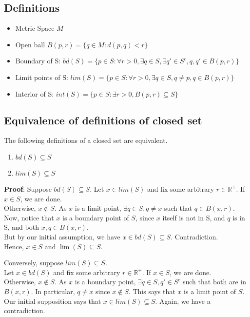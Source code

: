 \documentclass{article}
\begin{document}
\subsection{Definitions}
\begin{itemize}
	\item Metric Space $M$
	\item Open ball $B(p,r)=\{q\in M : d(p,q) < r \}$
	\item Boundary of S: $bd(S)=\{p\in S : \forall r > 0, \exists q\in S, \exists q'\in S^c, q,q'\in B(p,r) \}$
	\item Limit points of S: $lim(S)=\{p\in S : \forall r > 0, \exists q\in S, q\neq p, q\in B(p,r) \}$
	\item Interior of S: $int(S)=\{p\in S : \exists r > 0, B(p,r)\subseteq S\}$
\end{itemize}
\subsection{Equivalence of definitions of closed set}
The following definitions of a closed set are equivalent.

\begin{enumerate}
	\item $bd(S)\subseteq S$
	\item $lim(S)\subseteq S$
\end{enumerate}

\textbf{Proof}: Suppose $bd(S)\subseteq S$. 
Let $x\in lim(S)$ and fix some arbitrary $r\in \mathbb{R}^+$.
If $x\in S$, we are done.\\
Otherwise,  $x\not \in S$. As $x$ is a limit point, $\exists q\in S, q\neq x$ such that $q\in B(x,r)$. Now, notice that $x$ is a boundary point of $S$, since $x$ itself is not in S, and $q$ is in S, and both $x,q\in B(x,r)$.\\
But by our initial assumption, we have $x\in bd(S)\subseteq S$. Contradiction.\\
Hence, $x\in S$ and $\lim(S)\subseteq S$.

Conversely, suppose $lim(S)\subseteq S$.\\
Let $x\in bd(S)$ and fix some arbitrary $r\in \mathbb{R}^+$. If $x\in S$, we are done.\\
Otherwise, $x\not \in S$. As $x$ is a boundary point, $\exists q\in S, q' \in S^c$ such that both are in $B(x,r)$. In particular, $q\neq x$ since $x\not \in S$. This says that $x$ is a limit point of $S$.\\
Our initial supposition says that $x\in lim(S)\subseteq S$. Again, we have a contradiction.  
\end{document}
